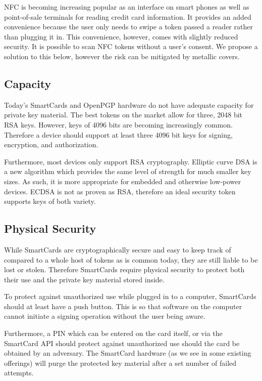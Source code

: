 \documentclass[11pt, twocolumn]{article}
\begin{document}
NFC is becoming increasing popular as an interface on smart phones as well as
point-of-sale terminals for reading credit card information. It provides an
added convenience because the user only needs to swipe a token passed a reader
rather than plugging it in. This convenience, however, comes with slightly
reduced security. It is possible to scan NFC tokens without a user's consent. We
propose a solution to this below, however the risk can be mitigated by metallic
covers.

\subsection{Capacity}

Today's SmartCards and OpenPGP hardware do not have adequate capacity for
private key material. The best tokens on the market allow for three, 2048 bit
RSA keys. However, keys of 4096 bits are becoming increasingly common. Therefore
a device should support at least three 4096 bit keys for signing, encryption,
and authorization.

Furthermore, most devices only support RSA cryptography. Elliptic curve DSA is a
new algorithm which provides the same level of strength for much smaller key
sizes. As such, it is more appropriate for embedded and otherwise low-power
devices. ECDSA is not as proven as RSA, therefore an ideal security token
supports keys of both variety.

\subsection{Physical Security}

While SmartCards are cryptographically secure and easy to keep track of compared
to a whole host of tokens as is common today, they are still liable to be lost
or stolen. Therefore SmartCards require physical security to protect both their
use and the private key material stored inside.

To protect against unauthorized use while plugged in to a computer, SmartCards
should at least have a push button. This is so that software on the computer
cannot initiate a signing operation without the user being aware.

Furthermore, a PIN which can be entered on the card itself, or via the SmartCard
API should protect against unauthorized use should the card be obtained by an
adversary. The SmartCard hardware (as we see in some existing offerings) will
purge the protected key material after a set number of failed attempts.
\end{document}
